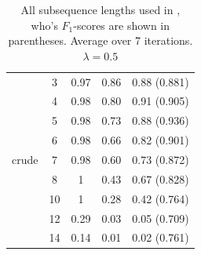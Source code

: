 \begin{table}
\begin{tabular}{| c | c | c | c | c | }
		
		& 3 & 0.97 & 0.86 &  0.88  (0.881)  \\ 
		& 4 & 0.98 & 0.80 & 0.91  (0.905)   \\ 
		& 5 & 0.98 & 0.73 &  0.88 (0.936)   \\ 
		& 6 & 0.98 & 0.66 &  0.82  (0.901)  \\
		crude& 7 & 0.98 & 0.60 &  0.73 (0.872)  \\
		& 8 & 1 & 0.43 &  0.67   (0.828) \\ 
		& 10 & 1 & 0.28 &  0.42   (0.764) \\ 
		& 12 & 0.29 & 0.03 &  0.05   (0.709) \\ 
		& 14 & 0.14 & 0.01 &  0.02   (0.761) \\ \hline 
			
	\end{tabular}
\caption{All subsequence lengths used in \cite{lodhi}, who's  $ F_1 $-scores are shown in parentheses. Average over 7 iterations.  $  \lambda = 0.5$\label{tab:appendix_ssk_n}}

\end{table}




\pagebreak